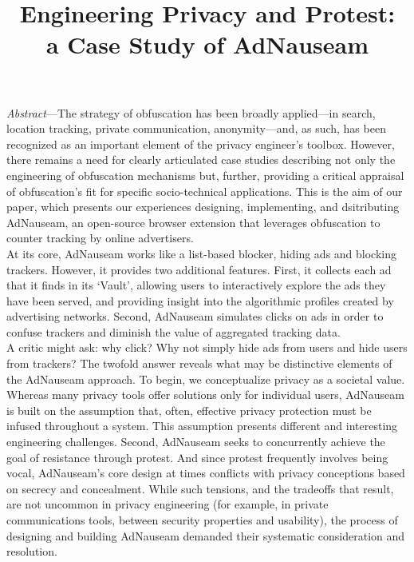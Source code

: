 \documentclass[conference]{IEEEtran}
\begin{document}
\title{Engineering Privacy and Protest:\\a Case Study of AdNauseam}

\author{
   \and
}

\maketitle

\emph{Abstract}---The strategy of obfuscation has been broadly applied---in search, location tracking, private communication, anonymity---and, as such, has been recognized as an important element of the privacy engineer's toolbox. However, there remains a need for clearly articulated case studies describing not only the engineering of obfuscation mechanisms but, further, providing a critical appraisal of obfuscation's fit for specific socio-technical applications. This is the aim of our paper, which presents our experiences designing, implementing, and dsitributing AdNauseam, an open-source browser extension that leverages obfuscation to counter tracking by online advertisers.\\
\indent At its core, AdNauseam works like a list-based blocker, hiding ads and blocking trackers. However, it provides two additional features. First, it collects each ad that it finds in its ‘Vault’, allowing users to interactively explore the ads they have been served, and providing insight into the algorithmic profiles created by advertising networks. Second, AdNauseam simulates clicks on ads in order to confuse trackers and diminish the value of aggregated tracking data.\\
\indent A critic might ask: why click? Why not simply hide ads from users and hide users from trackers? The twofold answer reveals what may be distinctive elements of the AdNauseam approach. To begin, we conceptualize privacy as a societal value. Whereas many privacy tools offer solutions only for individual users, AdNauseam is built on the assumption that, often, effective privacy protection must be infused throughout a system. This assumption presents different and interesting engineering challenges. Second, AdNauseam seeks to concurrently achieve the goal of resistance through protest. And since protest frequently involves being vocal, AdNauseam's core design at times conflicts with privacy conceptions based on secrecy and concealment. While such tensions, and the tradeoffs that result, are not uncommon in privacy engineering (for example, in private communications tools, between security properties and usability), the process of designing and building AdNauseam demanded their systematic consideration and resolution.\\
\end{document}
